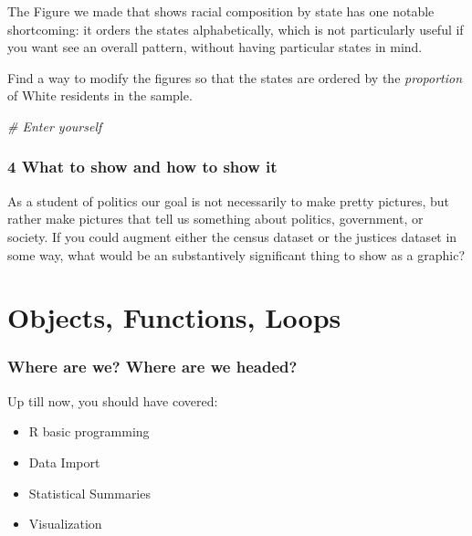 \documentclass[]{book}
\newenvironment{Shaded}{\begin{snugshade}}{\end{snugshade}}
\newcommand{\CommentTok}[1]{\textcolor[rgb]{0.56,0.35,0.01}{\textit{#1}}}
\providecommand{\tightlist}{%
  \setlength{\itemsep}{0pt}\setlength{\parskip}{0pt}}
\theoremstyle{definition}
\theoremstyle{definition}
\theoremstyle{definition}
\theoremstyle{remark}
\begin{document}
\begin{Shaded}
\begin{Highlighting}[]
\begin{Shaded}
\begin{Highlighting}[]
\begin{Shaded}
\begin{Highlighting}[]
The Figure we made that shows racial composition by state has one notable shortcoming: it orders the states alphabetically, which is not particularly useful if you want see an overall pattern, without having particular states in mind.

Find a way to modify the figures so that the states are ordered by the \emph{proportion} of White residents in the sample.

\begin{Shaded}
\begin{Highlighting}[]
\CommentTok{# Enter yourself}
\end{Highlighting}
\end{Shaded}

\hypertarget{what-to-show-and-how-to-show-it}{%
\subsection*{4 What to show and how to show it}\label{what-to-show-and-how-to-show-it}}

As a student of politics our goal is not necessarily to make pretty pictures, but rather make pictures that tell us something about politics, government, or society. If you could augment either the census dataset or the justices dataset in some way, what would be an substantively significant thing to show as a graphic?

\hypertarget{robjloops}{%
\chapter{Objects, Functions, Loops}\label{robjloops}}

\hypertarget{where-are-we-where-are-we-headed-3}{%
\subsection*{Where are we? Where are we headed?}\label{where-are-we-where-are-we-headed-3}}

Up till now, you should have covered:

\begin{itemize}
\tightlist
\item
  R basic programming
\item
  Data Import
\item
  Statistical Summaries
\item
  Visualization
\end{itemize}


\end{Highlighting}
\end{Shaded}
\end{Highlighting}
\end{Shaded}
\end{Highlighting}
\end{Shaded}
\end{document}
